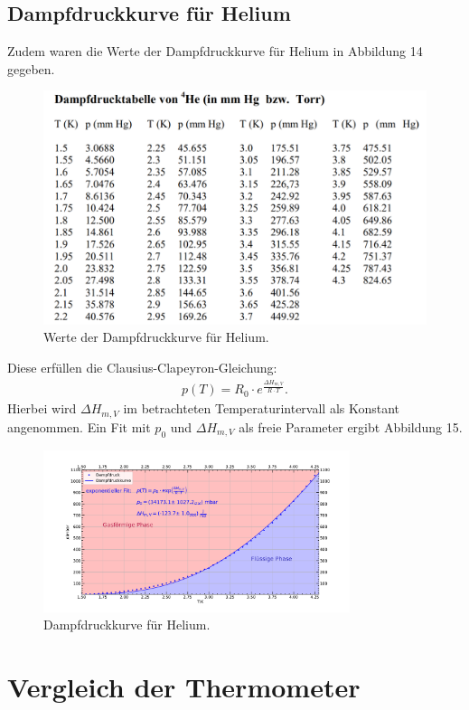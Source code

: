 \documentclass[german,  %
parskip=full,  %
]{scrartcl}
\begin{document}
\subsection{Dampfdruckkurve für Helium}
Zudem waren die Werte der Dampfdruckkurve für Helium in Abbildung 14 gegeben.
\newpage
\begin{figure}[h!]
\centering
\includegraphics[width=\textwidth]{dampf_werte}
\caption{Werte der Dampfdruckkurve für Helium.}
\end{figure}
Diese erfüllen die Clausius-Clapeyron-Gleichung:
\begin{align}
p(T)= R_0 \cdot e^{\frac{\Delta H_{m,V}}{R\cdot T}}.
\end{align}
Hierbei wird $\Delta H_{m,V}$ im betrachteten Temperaturintervall als Konstant angenommen. Ein Fit mit $p_0$ und $\Delta H_{m,V}$ als freie Parameter ergibt Abbildung 15.
\begin{figure}[h!]
\centering
\includegraphics[width=0.8\textwidth]{Dampfdruckkurve_He4.pdf}
\caption{Dampfdruckkurve für Helium.}
\end{figure}
\newpage

\section{Vergleich der Thermometer}
\end{document}
